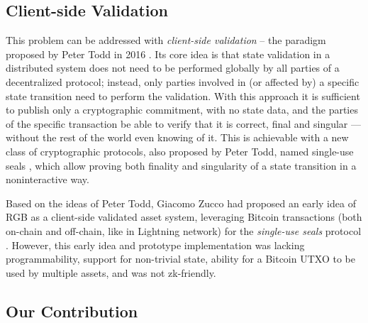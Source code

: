 \documentclass[9pt,oneside]{amsart}
\begin{document}
\begin{multicols}{2}
\subsection{Client-side Validation}

This problem can be addressed with \emph{client-side validation} –
the paradigm proposed by Peter Todd in 2016 \cite{CSV}.
Its core idea is that state validation in a distributed system
does not need to be performed globally by all parties of a decentralized protocol;
instead, only parties involved in (or affected by)
a specific state transition need to perform the validation.
With this approach it is sufficient to publish only a cryptographic commitment,
with no state data, and the parties of the specific transaction
be able to verify that it is correct, final and singular —
without the rest of the world even knowing of it.
This is achievable with a new class of cryptographic protocols,
also proposed by Peter Todd, named single-use seals \cite{SUS1, SUS2, SUS3, SUS4},
which allow proving both finality and singularity\footnotemark
of a state transition in a noninteractive way.


Based on the ideas of Peter Todd, Giacomo Zucco had proposed
an early idea of RGB as a client-side validated asset system,
leveraging Bitcoin transactions (both on-chain and off-chain, like in Lightning network)
for the \emph{single-use seals} protocol \cite{Zucco}.
However, this early idea and prototype implementation was lacking programmability,
support for non-trivial state, ability for a Bitcoin UTXO to be used by multiple assets,
and was not zk-friendly.

\subsection{Our Contribution}


\end{multicols}
\end{document}

